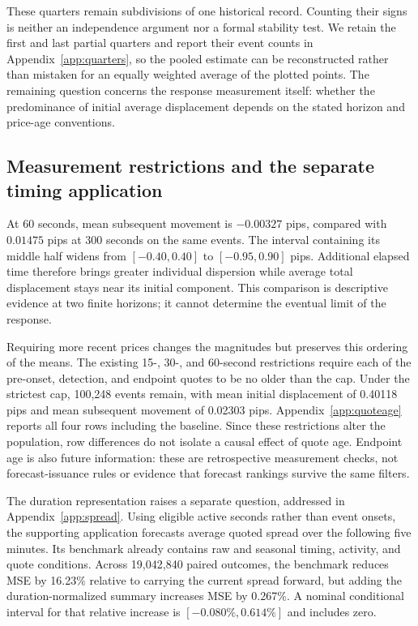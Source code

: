 \documentclass[12pt,letterpaper]{article}
\begin{document}
These quarters remain subdivisions of one historical record. Counting their signs is neither an independence argument nor a formal stability test. We retain the first and last partial quarters and report their event counts in Appendix~\ref{app:quarters}, so the pooled estimate can be reconstructed rather than mistaken for an equally weighted average of the plotted points. The remaining question concerns the response measurement itself: whether the predominance of initial average displacement depends on the stated horizon and price-age conventions.

\subsection{Measurement restrictions and the separate timing application}
At 60 seconds, mean subsequent movement is $-0.00327$ pips, compared with $0.01475$ pips at 300 seconds on the same events. The interval containing its middle half widens from $[-0.40,0.40]$ to $[-0.95,0.90]$ pips. Additional elapsed time therefore brings greater individual dispersion while average total displacement stays near its initial component. This comparison is descriptive evidence at two finite horizons; it cannot determine the eventual limit of the response.

Requiring more recent prices changes the magnitudes but preserves this ordering of the means. The existing 15-, 30-, and 60-second restrictions require each of the pre-onset, detection, and endpoint quotes to be no older than the cap. Under the strictest cap, 100,248 events remain, with mean initial displacement of 0.40118 pips and mean subsequent movement of 0.02303 pips. Appendix~\ref{app:quoteage} reports all four rows including the baseline. Since these restrictions alter the population, row differences do not isolate a causal effect of quote age. Endpoint age is also future information: these are retrospective measurement checks, not forecast-issuance rules or evidence that forecast rankings survive the same filters.

The duration representation raises a separate question, addressed in Appendix~\ref{app:spread}. Using eligible active seconds rather than event onsets, the supporting application forecasts average quoted spread over the following five minutes. Its benchmark already contains raw and seasonal timing, activity, and quote conditions. Across 19,042,840 paired outcomes, the benchmark reduces MSE by 16.23\% relative to carrying the current spread forward, but adding the duration-normalized summary increases MSE by 0.267\%. A nominal conditional interval for that relative increase is $[-0.080\%,0.614\%]$ and includes zero.
\end{document}
